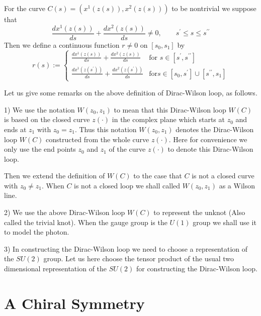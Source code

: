 \documentclass[a4paper,a4paper]{article}
\begin{document}
For the curve $C(s)=(x^1(z(s)),x^2(z(s)))$ to be nontrivial we suppose that 
\begin{equation}
\frac{dx^1(z(s))}{ds}+\frac{dx^2(z(s))}{ds}\neq 0,
\quad \quad s^{\prime}\leq s \leq s^{\prime\prime}
\label{curve}
\end{equation}
Then we define a continuous function $r\neq 0$ on 
$[s_0, s_1]$ by
\begin{equation}
 r(s) := \left\{\begin{array}{cc}
\frac{dx^1(z(s))}{ds}+\frac{dx^2(z(s))}{ds} &
 \mbox{for $s\in [s^{\prime}, s^{\prime\prime}]$} \\
\frac{dx^1(z(s^{\prime}))}{ds}+
\frac{dx^2(z(s^{\prime}))}{ds}  &
\mbox{for
$s\in [s_0, s^{\prime}]\cup [s^{\prime\prime}, s_1]$}
\end{array}
\right.
\label{curve2}
\end{equation}

Let us give some remarks on the above definition
of Dirac-Wilson loop, as follows.

1) We use the notation $W(z_0, z_1)$ to mean that
this Dirac-Wilson loop $W(C)$ is based on the closed curve $z(\cdot)$
in the complex plane which starts at $z_0$ and ends
at $z_1$ with $z_0=z_1$. Thus this notation $W(z_0, z_1)$ denotes the Dirac-Wilson loop $W(C)$ constructed from the whole curve $z(\cdot)$. Here for convenience we only use the end points $z_0$ and
$z_1$ of the curve $z(\cdot)$ to denote this Dirac-Wilson loop.

Then we  extend the definition of $W(C)$ to the case that $C$ is not a closed curve with $z_0\neq z_1$. When $C$ is not a closed loop we shall
called $W(z_0, z_1)$ as a Wilson line.

2) We use the above Dirac-Wilson loop $W(C)$ to represent the unknot (Also called the trivial knot). When the gauge group is the $U(1)$ group we shall use it to model the photon.

3) In constructing the Dirac-Wilson loop we need to choose a representation of the $SU(2)$ group. Let us here choose the tensor product of the usual two dimensional representation of the $SU(2)$ for constructing the Dirac-Wilson loop. 



\section{A Chiral Symmetry} \label{sec5}
\end{document}
